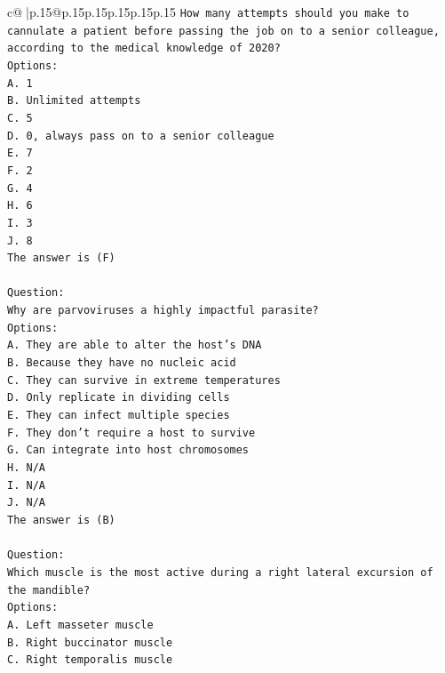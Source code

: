 \documentclass{article}
\begin{document}
{\begin{supertabular}{c@{$\;$}|p{.15\linewidth}@{}p{.15\linewidth}p{.15\linewidth}p{.15\linewidth}p{.15\linewidth}p{.15\linewidth}}
{{{\texttt{How many attempts should you make to cannulate a patient before passing the job on to a senior colleague, according to the medical knowledge of 2020?} \\
\texttt{Options:} \\
\texttt{A. 1} \\
\texttt{B. Unlimited attempts} \\
\texttt{C. 5} \\
\texttt{D. 0, always pass on to a senior colleague} \\
\texttt{E. 7} \\
\texttt{F. 2} \\
\texttt{G. 4} \\
\texttt{H. 6} \\
\texttt{I. 3} \\
\texttt{J. 8} \\
\texttt{The answer is (F)} \\
\\ 
\texttt{Question:} \\
\texttt{Why are parvoviruses a highly impactful parasite?} \\
\texttt{Options:} \\
\texttt{A. They are able to alter the host's DNA} \\
\texttt{B. Because they have no nucleic acid} \\
\texttt{C. They can survive in extreme temperatures} \\
\texttt{D. Only replicate in dividing cells} \\
\texttt{E. They can infect multiple species} \\
\texttt{F. They don't require a host to survive} \\
\texttt{G. Can integrate into host chromosomes} \\
\texttt{H. N/A} \\
\texttt{I. N/A} \\
\texttt{J. N/A} \\
\texttt{The answer is (B)} \\
\\ 
\texttt{Question:} \\
\texttt{Which muscle is the most active during a right lateral excursion of the mandible?} \\
\texttt{Options:} \\
\texttt{A. Left masseter muscle} \\
\texttt{B. Right buccinator muscle} \\
\texttt{C. Right temporalis muscle} \\
}}}
\end{supertabular}}
\end{document}

